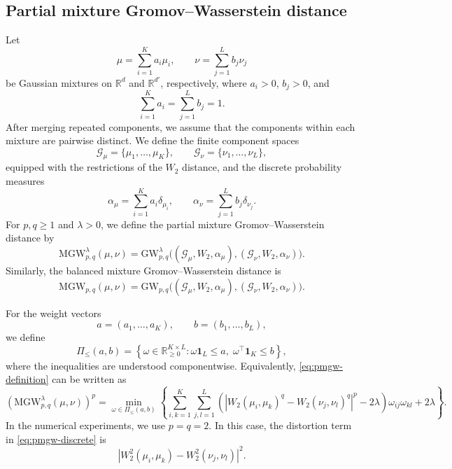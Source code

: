 \documentclass[a4paper,11pt]{article}
\numberwithin{equation}{section}
\newcommand{\RR}{\mathbb{R}}
\newcommand{\GW}{\mathrm{GW}}
\newcommand{\MGW}{\mathrm{MGW}}
\newcommand{\ones}{\mathbf{1}}
\begin{document}
\subsection{Partial mixture Gromov--Wasserstein distance}\label{subsec:pmgw-definition}
Let
\begin{equation*}
  \mu=\sum_{i=1}^{K}a_i\mu_i,\qquad \nu=\sum_{j=1}^{L}b_j\nu_j
\end{equation*}
be Gaussian mixtures on $\RR^d$ and $\RR^{d'}$, respectively, where $a_i>0$, $b_j>0$, and
\begin{equation*}
  \sum_{i=1}^{K}a_i=\sum_{j=1}^{L}b_j=1.
\end{equation*}
After merging repeated components, we assume that the components within each mixture are pairwise distinct. We define the finite component spaces
\begin{equation*}
  \mathcal G_\mu=\{\mu_1,\ldots,\mu_K\},\qquad
  \mathcal G_\nu=\{\nu_1,\ldots,\nu_L\},
\end{equation*}
equipped with the restrictions of the $W_2$ distance, and the discrete probability measures
\begin{equation}\label{eq:pmgw-component-measures}
  \alpha_\mu=\sum_{i=1}^{K}a_i\delta_{\mu_i},\qquad
  \alpha_\nu=\sum_{j=1}^{L}b_j\delta_{\nu_j}.
\end{equation}
For $p,q\geq1$ and $\lambda>0$, we define the partial mixture Gromov--Wasserstein distance by
\begin{equation}\label{eq:pmgw-definition}
  \MGW^{\lambda}_{p,q}(\mu,\nu)=\GW^{\lambda}_{p,q}\bigl((\mathcal G_\mu,W_2,\alpha_\mu),(\mathcal G_\nu,W_2,\alpha_\nu)\bigr).
\end{equation}
Similarly, the balanced mixture Gromov--Wasserstein distance is 
\begin{equation}\label{eq:mgw-definition}
  \MGW_{p,q}(\mu,\nu)=\GW_{p,q}\bigl((\mathcal G_\mu,W_2,\alpha_\mu),(\mathcal G_\nu,W_2,\alpha_\nu)\bigr).
\end{equation}

For the weight vectors
\begin{equation*}
  a=(a_1,\ldots,a_K),\qquad
  b=(b_1,\ldots,b_L),
\end{equation*}
we define
\begin{equation*}
  \Pi_{\leq}(a,b)=\left\{\omega\in\RR_{\geq0}^{K\times L}: \omega\ones_L\leq a,\; \omega^\top\ones_K\leq b\right\},
\end{equation*}
where the inequalities are understood componentwise. Equivalently, \eqref{eq:pmgw-definition} can be written as
\begin{equation}\label{eq:pmgw-discrete}
  \left(\MGW^{\lambda}_{p,q}(\mu,\nu)\right)^p=\min_{\omega\in\Pi_{\leq}(a,b)}\left\{\sum_{i,k=1}^{K}\sum_{j,l=1}^{L}\left(\left|W_2(\mu_i,\mu_k)^q-W_2(\nu_j,\nu_l)^q\right|^p-2\lambda\right)\omega_{ij}\omega_{kl}+2\lambda\right\}.
\end{equation}
In the numerical experiments, we use $p=q=2$. In this case, the distortion term in \eqref{eq:pmgw-discrete} is
\begin{equation*}
\left| W_2^2(\mu_i,\mu_k) - W_2^2(\nu_j,\nu_l) \right|^2.
\end{equation*}
\end{document}
